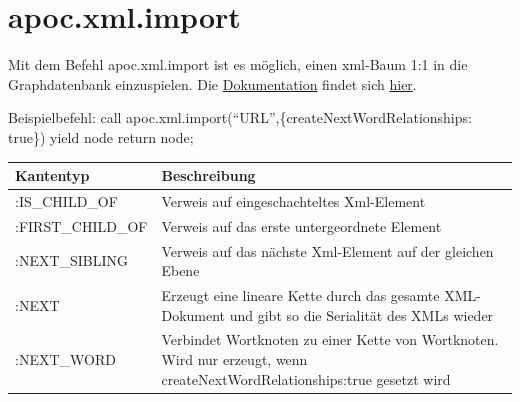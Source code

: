 \documentclass[ngerman,]{scrreprt}
\begin{document}
\section{apoc.xml.import}\label{apoc.xml.import}

Mit dem Befehl apoc.xml.import ist es möglich, einen xml-Baum 1:1 in die Graphdatenbank einzuspielen. Die \href{https://neo4j-contrib.github.io/neo4j-apoc-procedures/\#_import_xml_directly}{Dokumentation} findet sich \href{https://neo4j-contrib.github.io/neo4j-apoc-procedures/\#_import_xml_directly}{hier}.

Beispielbefehl: call apoc.xml.import(``URL'',\{createNextWordRelationships: true\}) yield node return node;

\begin{longtable}[]{@{}ll@{}}
\toprule
\begin{minipage}[b]{0.13\columnwidth}\raggedright\strut
Kantentyp\strut
\end{minipage} & \begin{minipage}[b]{0.17\columnwidth}\raggedright\strut
Beschreibung\strut
\end{minipage}\tabularnewline
\midrule
\endhead
\begin{minipage}[t]{0.13\columnwidth}\raggedright\strut
:IS\_CHILD\_OF\strut
\end{minipage} & \begin{minipage}[t]{0.17\columnwidth}\raggedright\strut
Verweis auf eingeschachteltes Xml-Element\strut
\end{minipage}\tabularnewline
\begin{minipage}[t]{0.13\columnwidth}\raggedright\strut
:FIRST\_CHILD\_OF\strut
\end{minipage} & \begin{minipage}[t]{0.17\columnwidth}\raggedright\strut
Verweis auf das erste untergeordnete Element\strut
\end{minipage}\tabularnewline
\begin{minipage}[t]{0.13\columnwidth}\raggedright\strut
:NEXT\_SIBLING\strut
\end{minipage} & \begin{minipage}[t]{0.17\columnwidth}\raggedright\strut
Verweis auf das nächste Xml-Element auf der gleichen Ebene\strut
\end{minipage}\tabularnewline
\begin{minipage}[t]{0.13\columnwidth}\raggedright\strut
:NEXT\strut
\end{minipage} & \begin{minipage}[t]{0.17\columnwidth}\raggedright\strut
Erzeugt eine lineare Kette durch das gesamte XML-Dokument und gibt so die Serialität des XMLs wieder\strut
\end{minipage}\tabularnewline
\begin{minipage}[t]{0.13\columnwidth}\raggedright\strut
:NEXT\_WORD\strut
\end{minipage} & \begin{minipage}[t]{0.17\columnwidth}\raggedright\strut
Verbindet Wortknoten zu einer Kette von Wortknoten. Wird nur erzeugt, wenn createNextWordRelationships:true gesetzt wird\strut
\end{minipage}\tabularnewline
\bottomrule
\end{longtable}
\end{document}
